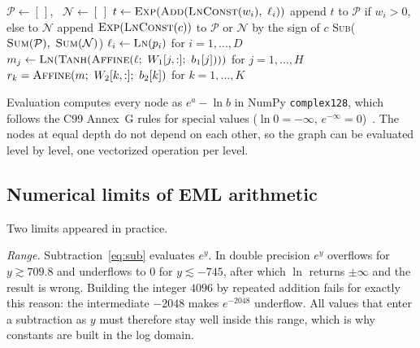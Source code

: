 \documentclass[11pt]{article}
\begin{document}
\begin{algorithm}[tb]
\caption{Compiling a one-hidden-layer $\tanh$ network
($W_1\in\mathbb{R}^{H\times D}$, $b_1$, $W_2\in\mathbb{R}^{K\times H}$, $b_2$)
into a pure EML expression with leaves $\mathbf{1}$ and the pixels
$p_1,\dots,p_D$.}
\label{alg:compile}
\small
\begin{algorithmic}[1]
 
  \State $\mathcal{P}\gets[\,]$, \ $\mathcal{N}\gets[\,]$
    \State $t\gets\textsc{Exp}(\textsc{Add}(\textsc{LnConst}(w_i),\ \ell_i))$ 
    \State append $t$ to $\mathcal{P}$ if $w_i>0$, else to $\mathcal{N}$
  \EndFor
  \State append $\textsc{Exp}(\textsc{LnConst}(c))$ to $\mathcal{P}$ or $\mathcal{N}$ by the sign of $c$
  \State \Return \textsc{Sub}($\textsc{Sum}(\mathcal{P}),\ \textsc{Sum}(\mathcal{N})$)
\EndFunction
{}
  \State $\ell_i\gets\textsc{Ln}(p_i)$ for $i=1,\dots,D$
  \State $m_j\gets\textsc{Ln}(\textsc{Tanh}(\textsc{Affine}(\ell;\ W_1[j,:];\ b_1[j])))$ for $j=1,\dots,H$
  \State \Return $r_k=\textsc{Affine}(m;\ W_2[k,:];\ b_2[k])$ for $k=1,\dots,K$ 
\EndFunction
\end{algorithmic}
\end{algorithm}

Evaluation computes every node as
$e^{a}-\ln b$ in NumPy \texttt{complex128}, which follows the C99 Annex~G
rules for special values ($\ln 0=-\infty$, $e^{-\infty}=0$)~\cite{c99}. The
nodes at equal depth do not depend on each other, so the graph can be
evaluated level by level, one vectorized operation per level.

\subsection{Numerical limits of EML arithmetic}
\label{sec:numerics}
Two limits appeared in practice.

\emph{Range.} Subtraction~\eqref{eq:sub} evaluates $e^{y}$. In double
precision $e^{y}$ overflows for $y\gtrsim709.8$ and underflows to $0$ for
$y\lesssim-745$, after which $\ln$ returns $\pm\infty$ and the result is
wrong. Building the integer $4096$ by repeated addition fails for exactly this
reason: the intermediate $-2048$ makes $e^{-2048}$ underflow. All values that
enter a subtraction as $y$ must therefore stay well inside this range, which
is why constants are built in the log domain.
\end{document}
